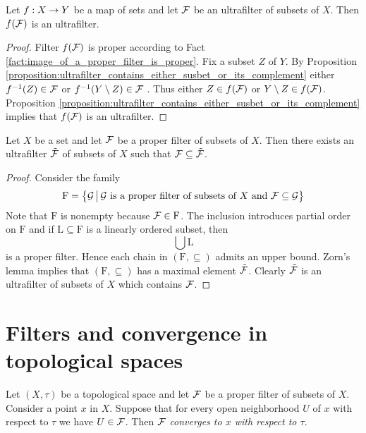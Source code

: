 \begin{corollary}\label{corollary:ultrafilters_are_preserved_by_images}
Let $f:X\rightarrow Y$ be a map of sets and let ${\mathcal F}$ be an ultrafilter of subsets of $X$. Then $f({\mathcal F})$ is an ultrafilter.
\end{corollary}
\begin{proof}
Filter $f({\mathcal F})$ is proper according to Fact \ref{fact:image_of_a_proper_filter_is_proper}. Fix a subset $Z$ of $Y$.  By Proposition \ref{proposition:ultrafilter_contains_either_susbet_or_its_complement} either $f^{-1}(Z) \in {\mathcal F}$ or $f^{-1}(Y\setminus Z) \in {\mathcal F}$ . Thus either $Z \in f({\mathcal F})$ or $Y\setminus Z \in f({\mathcal F})$. Proposition \ref{proposition:ultrafilter_contains_either_susbet_or_its_complement} implies that $f({\mathcal F})$ is an ultrafilter.
\end{proof}

\begin{proposition}\label{proposition:existence_of_ultrafilters}
Let $X$ be a set and let ${\mathcal F}$ be a proper filter of subsets of $X$. Then there exists an ultrafilter $\tilde{{\mathcal F}}$ of subsets of $X$ such that ${\mathcal F} \subseteq \tilde{{\mathcal F}}$.
\end{proposition}
\begin{proof}
Consider the family
$$\mathrm{F} = \big\{{\mathcal G}\,\big|\,{\mathcal G}\mbox{ is a proper filter of subsets of }X\mbox{ and }{\mathcal F} \subseteq {\mathcal G}\big\}$$
Note that $\mathrm{F}$ is nonempty because ${\mathcal F} \in \mathrm{F}$. The inclusion introduces partial order on $\mathrm{F}$ and if $\mathrm{L}\subseteq \mathrm{F}$ is a linearly ordered subset, then
$$\bigcup \mathrm{L}$$
is a proper filter. Hence each chain in $\left(\mathrm{F},\subseteq\right)$ admits an upper bound. Zorn's lemma implies that $\left(\mathrm{F},\subseteq\right)$ has a maximal element $\tilde{{\mathcal F}}$. Clearly $\tilde{{\mathcal F}}$ is an ultrafilter of subsets of $X$ which contains ${\mathcal F}$.
\end{proof}

\section{Filters and convergence in topological spaces}

\begin{definition}
Let $(X,\tau)$ be a topological space and let ${\mathcal F}$ be a proper filter of subsets of $X$. Consider a point $x$ in $X$. Suppose that for every open neighborhood $U$ of $x$ with respect to $\tau$ we have $U \in {\mathcal F}$. Then ${\mathcal F}$ \textit{converges to $x$ with respect to $\tau$}.
\end{definition}

